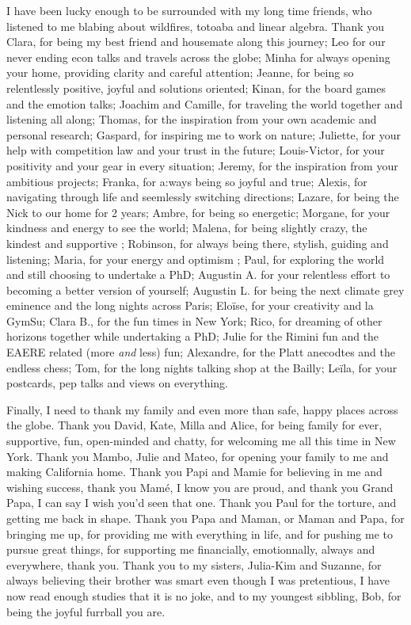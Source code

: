 I have been lucky enough to be surrounded with my long time friends, who listened to me blabing about wildfires, totoaba and linear algebra. Thank you Clara, for being my best friend and housemate along this journey; Leo for our never ending econ talks and travels across the globe; Minha for always opening your home, providing clarity and careful attention;  Jeanne, for being so relentlessly positive, joyful and solutions oriented; Kinan, for the board games and the emotion talks; Joachim and Camille, for traveling the world together and listening all along; Thomas, for the inspiration from your own academic and personal research; Gaspard, for inspiring me to work on nature; Juliette, for your help with competition law and your trust in the future; Louis-Victor, for your positivity and your gear in every situation; Jeremy, for the inspiration from your ambitious projects; Franka, for a:ways being so joyful and true; Alexis, for navigating through life and seemlessly switching directions; Lazare, for being the Nick to our home for 2 years; Ambre, for being so energetic;  Morgane, for your kindness and energy to see the world; Malena, for being slightly crazy, the kindest and supportive ; Robinson, for always being there, stylish, guiding and listening; Maria, for your energy and optimism ; Paul, for exploring the world and still choosing to undertake a PhD;  Augustin A. for your relentless effort to becoming a better version of yourself; Augustin L. for being the next climate grey eminence and the long nights across Paris; Elo\"ise, for your creativity and la GymSu; Clara B., for the fun times in New York; Rico, for dreaming of other horizons together while undertaking a PhD; Julie for the Rimini fun and the EAERE related (more \textit{and} less) fun; Alexandre, for the Platt anecodtes and the endless chess; Tom, for the long nights talking shop at the Bailly; Le\"ila, for your postcards, pep talks and views on everything.

Finally, I need to thank my family and even more than safe, happy places across the globe. Thank you David, Kate, Milla and Alice, for being family for ever, supportive, fun, open-minded and chatty, for welcoming me all this time in New York. Thank you Mambo, Julie and Mateo, for opening your family to me and making California home. Thank you Papi and Mamie for believing in me and wishing success, thank you Mamé, I know you are proud, and thank you Grand Papa, I can say I wish you'd seen that one. Thank you Paul for the torture, and getting me back in shape. Thank you Papa and Maman, or Maman and Papa, for bringing me up, for providing me with everything in life, and for pushing me to pursue great things, for supporting me financially, emotionnally, always and everywhere, thank you. Thank you to my sisters, Julia-Kim and Suzanne, for always believing their brother was smart even though I was pretentious, I have now read enough studies that it is no joke, and to my youngest sibbling, Bob, for being the joyful furrball you are. 

